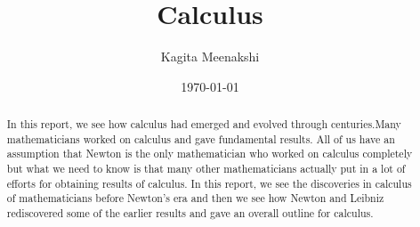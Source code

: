 \documentclass[a4paper,reqno,11pt]{amsart}
\theoremstyle{plain}%
\begin{document}
	

	\title{\textbf{Calculus}}
	
	\author[Kagita Meenakshi]{Kagita Meenakshi}
	
	
	
	\address{Department of Mathematics, Indian Institute of Technology Hyderabad, Kandi, Sangareddy - 502285}
	
	
	\date{\today}
	
	
	
	\begin{abstract}
	 In this report, we see how calculus had emerged and evolved through centuries.Many mathematicians worked on calculus and gave fundamental results. All of us have an assumption that Newton is the only mathematician who worked on calculus completely but what we need to know is that many other mathematicians actually put in a lot of efforts for obtaining results of calculus. In this report, we see the discoveries in calculus of mathematicians before Newton's era and then we see how Newton and Leibniz rediscovered some of the earlier results and gave an overall outline for calculus.
	\end{abstract}
	
	\maketitle
\end{document}
